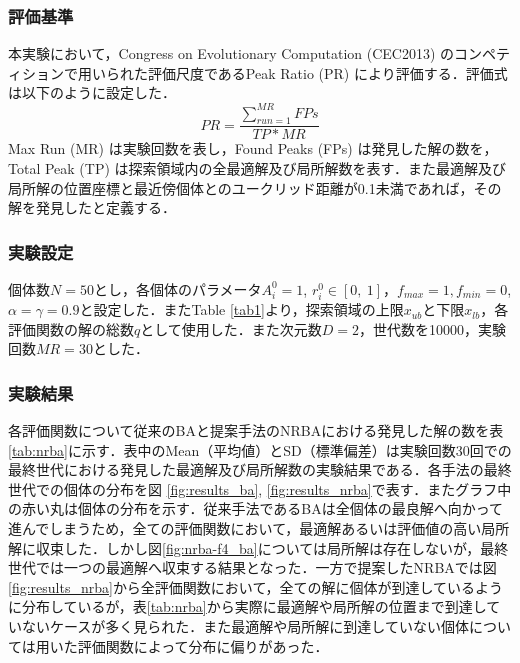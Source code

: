 \documentclass[a4j,11pt]{jarticle}
\begin{document}
\FloatBarrier
\subsubsection{評価基準}
\label{sss:NRBA-eval}
本実験において，Congress on Evolutionary Computation (CEC2013) \cite{CEC2013} のコンペティションで用いられた評価尺度であるPeak Ratio (PR) \cite{CDE} により評価する．評価式は以下のように設定した．
\begin{equation}
\label{eq:PR}
PR=\frac{\sum_{run=1}^{MR}FPs}{TP*MR}
\end{equation}
Max Run (MR) は実験回数を表し，Found Peaks (FPs) は発見した解の数を，Total Peak (TP) は探索領域内の全最適解及び局所解数を表す．また最適解及び局所解の位置座標と最近傍個体とのユークリッド距離が0.1未満であれば，その解を発見したと定義する．

\subsubsection{実験設定}
\label{sss:NRBA-setup}
個体数$N=50$とし，各個体のパラメータ$A_i^0=1$, $r_i^0 \in [0,\ 1]$，$f_{max}=1, f_{min}=0$, $\alpha = \gamma = 0.9$と設定した．またTable \ref{tab1}より，探索領域の上限$x_{ub}$と下限$x_{lb}$，各評価関数の解の総数$q$として使用した．また次元数$D=2$，世代数を10000，実験回数$MR=30$とした．

\subsubsection{実験結果}
\label{sss:NRBA-results}
各評価関数について従来のBAと提案手法のNRBAにおける発見した解の数を表\ref{tab:nrba}に示す．表中のMean（平均値）とSD（標準偏差）は実験回数30回での最終世代における発見した最適解及び局所解数の実験結果である．各手法の最終世代での個体の分布を図 \ref{fig:results_ba}, \ref{fig:results_nrba}で表す．またグラフ中の赤い丸は個体の分布を示す．従来手法であるBAは全個体の最良解へ向かって進んでしまうため，全ての評価関数において，最適解あるいは評価値の高い局所解に収束した．しかし図\ref{fig:nrba-f4_ba}については局所解は存在しないが，最終世代では一つの最適解へ収束する結果となった．一方で提案したNRBAでは図\ref{fig:results_nrba}から全評価関数において，全ての解に個体が到達しているように分布しているが，表\ref{tab:nrba}から実際に最適解や局所解の位置まで到達していないケースが多く見られた．また最適解や局所解に到達していない個体については用いた評価関数によって分布に偏りがあった．
\end{document}
